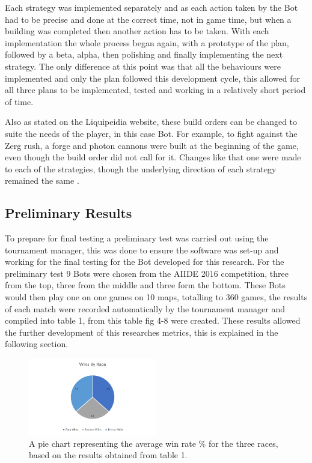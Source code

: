 \documentclass[journal]{IEEEtran}
\begin{document}
Each strategy was implemented separately and as each action taken by the Bot had to be precise and done at the correct time, not in game time, but when a building was completed then another action has to be taken. With each implementation the whole process began again, with a prototype of the plan, followed by a beta, alpha, then polishing and finally implementing the next strategy. The only difference at this point was that all the behaviours were implemented and only the plan followed this development cycle, this allowed for all three plans to be implemented, tested and working in a relatively short period of time.

Also as stated on the Liquipeidia website, these build orders can be changed to suite the needs of the player, in this case Bot. For example, to fight against the Zerg rush, a forge and photon cannons were built at the beginning of the game, even though the build order did not call for it. Changes like that one were made to each of the strategies, though the underlying direction of each strategy remained the same \cite{Alter}.

\subsection{Preliminary Results}
To prepare for final testing a preliminary test was carried out using the tournament manager, this was done to ensure the software was set-up and working for the final testing for the Bot developed for this research. For the preliminary test 9 Bots were chosen from the AIIDE 2016 competition, three from the top, three from the middle and three form the bottom. These Bots would then play one on one games on 10 maps, totalling to 360 games, the results of each match were recorded automatically by the tournament manager and compiled into table 1, from this table fig 4-8 were created. These results allowed the further development of this researches metrics, this is explained in the following section.

\begin{figure}[H]
	\centering
	\includegraphics[width=0.5\textwidth]{RacePie}
	\caption{A pie chart representing the average win rate \% for the three races, based on the results obtained from table 1.}
	\label{Fig4}
\end{figure}
\end{document}
